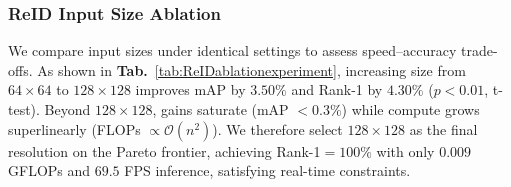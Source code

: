 \subsubsection{ReID Input Size Ablation}
We compare input sizes under identical settings to assess speed--accuracy trade-offs. As shown in \textbf{Tab.}~\ref{tab:ReIDablationexperiment}, increasing size from $64 \times 64$ to $128 \times 128$ improves mAP by $3.50\%$ and Rank-1 by $4.30\%$ ($p < 0.01$, t-test). Beyond $128 \times 128$, gains saturate (mAP $< 0.3\%$) while compute grows superlinearly (FLOPs $\propto \mathcal{O}(n^2)$). We therefore select $128 \times 128$ as the final resolution on the Pareto frontier, achieving Rank-1$=100\%$ with only $0.009$ GFLOPs and $69.5$ FPS inference, satisfying real-time constraints.
\begin{table}[H]
    \centering
    \caption{ReID Ablation Experiment Results}
    \label{tab:ReIDablationexperiment}
\end{table}


